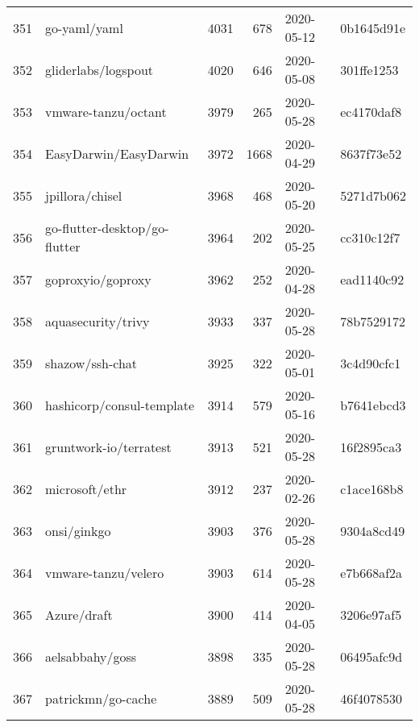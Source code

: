 \begin{footnotesize}
\begin{longtable}{llrrll}
        351 &                                       go-yaml/yaml &   4031 &    678 & 2020-05-12 &  0b1645d91e \\
        352 &                                gliderlabs/logspout &   4020 &    646 & 2020-05-08 &  301ffe1253 \\
        353 &                                vmware-tanzu/octant &   3979 &    265 & 2020-05-28 &  ec4170daf8 \\
        354 &                              EasyDarwin/EasyDarwin &   3972 &   1668 & 2020-04-29 &  8637f73e52 \\
        355 &                                    jpillora/chisel &   3968 &    468 & 2020-05-20 &  5271d7b062 \\
        356 &                      go-flutter-desktop/go-flutter &   3964 &    202 & 2020-05-25 &  cc310c12f7 \\
        357 &                                  goproxyio/goproxy &   3962 &    252 & 2020-04-28 &  ead1140c92 \\
        358 &                                 aquasecurity/trivy &   3933 &    337 & 2020-05-28 &  78b7529172 \\
        359 &                                    shazow/ssh-chat &   3925 &    322 & 2020-05-01 &  3c4d90cfc1 \\
        360 &                          hashicorp/consul-template &   3914 &    579 & 2020-05-16 &  b7641ebcd3 \\
        361 &                             gruntwork-io/terratest &   3913 &    521 & 2020-05-28 &  16f2895ca3 \\
        362 &                                     microsoft/ethr &   3912 &    237 & 2020-02-26 &  c1ace168b8 \\
        363 &                                        onsi/ginkgo &   3903 &    376 & 2020-05-28 &  9304a8cd49 \\
        364 &                                vmware-tanzu/velero &   3903 &    614 & 2020-05-28 &  e7b668af2a \\
        365 &                                        Azure/draft &   3900 &    414 & 2020-04-05 &  3206e97af5 \\
        366 &                                    aelsabbahy/goss &   3898 &    335 & 2020-05-28 &  06495afc9d \\
        367 &                                 patrickmn/go-cache &   3889 &    509 & 2020-05-28 &  46f4078530 \\

\end{longtable}
\end{footnotesize}
